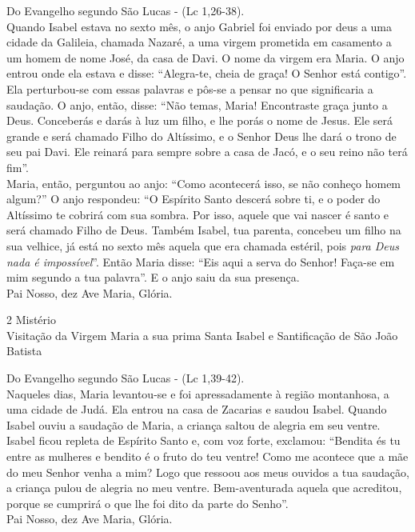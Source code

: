 \documentclass{book}
\begin{document}
\begin{flushleft}
    Do Evangelho segundo São Lucas - (\textcolor{VioletRed2}{Lc 1,26-38}). \\
    \hfill{} \break{}
    Quando Isabel estava no sexto mês, o anjo Gabriel foi enviado por deus a uma cidade da Galileia, chamada Nazaré, a uma virgem prometida em casamento a um homem de nome José, da casa de Davi. O nome da virgem era Maria. O anjo entrou onde ela estava e disse: ``Alegra-te, cheia de graça! O Senhor está contigo''. Ela perturbou-se com essas palavras e pôs-se a pensar no que significaria a saudação. O anjo, então, disse: ``Não temas, Maria! Encontraste graça junto a Deus. Conceberás e darás à luz um filho, e lhe porás o nome de Jesus. Ele será grande e será chamado Filho do Altíssimo, e o Senhor Deus lhe dará o trono de seu pai Davi. Ele reinará para sempre sobre a casa de Jacó, e o seu reino não terá fim''. \\
    \hfill{} \break{}
    Maria, então, perguntou ao anjo: ``Como acontecerá isso, se não conheço homem algum?'' O anjo respondeu: ``O Espírito Santo descerá sobre ti, e o poder do Altíssimo te cobrirá com sua sombra. Por isso, aquele que vai nascer é santo e será chamado Filho de Deus. Também Isabel, tua parenta, concebeu um filho na sua velhice, já está no sexto mês aquela que era chamada estéril, pois \textit{para Deus nada é impossível}''. Então Maria disse: ``Eis aqui a serva do Senhor! Faça-se em mim segundo a tua palavra''. E o anjo saiu da sua presença. \\
    \hfill{} \break{}
    Pai Nosso, dez Ave Maria, Glória.
\end{flushleft}
\newpage
\begin{center}
    2\textordmasculine{} Mistério \\ Visitação da Virgem Maria a sua prima Santa Isabel e Santificação de São João Batista
\end{center}
\begin{flushleft}
    Do Evangelho segundo São Lucas - (\textcolor{VioletRed2}{Lc 1,39-42}). \\
    \hfill{} \break{}
    Naqueles dias, Maria levantou-se e foi apressadamente à região montanhosa, a uma cidade de Judá. Ela entrou na casa de Zacarias e saudou Isabel. Quando Isabel ouviu a saudação de Maria, a criança saltou de alegria em seu ventre. Isabel ficou repleta de Espírito Santo e, com voz forte, exclamou: ``Bendita és tu entre as mulheres e bendito é o fruto do teu ventre! Como me acontece que a mãe do meu Senhor venha a mim? Logo que ressoou aos meus ouvidos a tua saudação, a criança pulou de alegria no meu ventre. Bem-aventurada aquela que acreditou, porque se cumprirá o que lhe foi dito da parte do Senho''. \\
    \hfill{} \break{}
    Pai Nosso, dez Ave Maria, Glória.
\end{flushleft}
\end{document}
